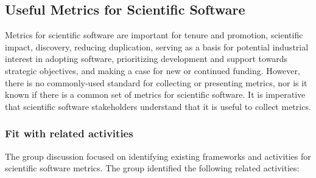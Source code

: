 \subsection{Useful Metrics for Scientific Software}
\label{sec:software-metrics}


Metrics for scientific software are important for tenure and promotion,
scientific impact, discovery, reducing duplication, serving as a basis for
potential industrial interest in adopting software, prioritizing development and
support towards strategic objectives, and making a case for new or continued
funding. However, there is no commonly-used standard for collecting or
presenting metrics, nor is it known if there is a common set of metrics for
scientific software. It is imperative that scientific software stakeholders
understand that it is useful to collect metrics.

\subsubsection{Fit with related activities}

The group discussion focused on identifying existing frameworks and activities
for scientific software metrics. The group identified the following related
activities:


